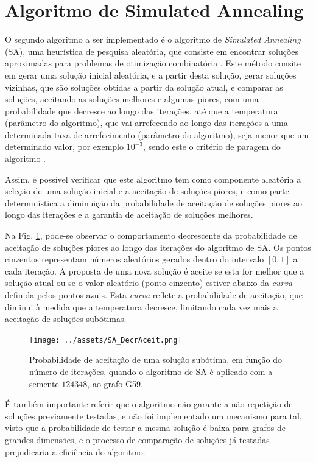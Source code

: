\documentclass[mirror, portugues]{revdetua}
\begin{document}
\section{Algoritmo de Simulated Annealing}

O segundo algoritmo a ser implementado é o algoritmo de \textit{Simulated Annealing} (SA), uma heurística de pesquisa aleatória, que consiste em encontrar soluções aproximadas para problemas de otimização combinatória \cite{SAT15}. Este método consite em gerar uma solução inicial aleatória, e a partir desta solução, gerar soluções vizinhas, que são soluções obtidas a partir da solução atual, e comparar as soluções, aceitando as soluções melhores e algumas piores, com uma probabilidade que decresce ao longo das iterações, até que a temperatura (parâmetro do algoritmo), que vai arrefecendo ao longo das iterações a uma determinada taxa de arrefecimento (parâmetro do algoritmo), seja menor que um determinado valor, por exemplo $10^{-3}$, sendo este o critério de paragem do algoritmo \cite{SA87}.

Assim, é possível verificar que este algoritmo tem como componente aleatória a seleção de uma solução inicial e a aceitação de soluções piores, e como parte determinística a diminuição da probabilidade de aceitação de soluções piores ao longo das iterações e a garantia de aceitação de soluções melhores.

Na Fig. \ref{fig:sa_aceitacao}, pode-se observar o comportamento decrescente da probabilidade de aceitação de soluções piores ao longo das iterações do algoritmo de SA. Os pontos cinzentos representam números aleatórios gerados dentro do intervalo $[0,1]$ a cada iteração. A proposta de uma nova solução é aceite se esta for melhor que a solução atual ou se o valor aleatório (ponto cinzento) estiver abaixo da \textit{curva} definida pelos pontos azuis. Esta \textit{curva} reflete a probabilidade de aceitação, que diminui à medida que a temperatura decresce, limitando cada vez mais a aceitação de soluções subótimas.

\begin{figure}[H]
    \centering
    \texttt{[image: ../assets/SA\_DecrAceit.png]}
    \caption{Probabilidade de aceitação de uma solução subótima, em função do número de iterações, quando o algoritmo de SA é aplicado com a semente $124348$, ao grafo G59.}
    \label{fig:sa_aceitacao}
\end{figure}

É também importante referir que o algoritmo não garante a não repetição de soluções previamente testadas, e não foi implementado um mecanismo para tal, visto que a probabilidade de testar a mesma solução é baixa para grafos de grandes dimensões, e o processo de comparação de soluções já testadas prejudicaria a eficiência do algoritmo.
\end{document}
